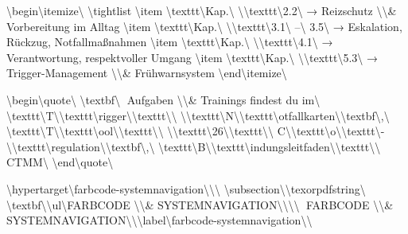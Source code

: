 \textbackslash{}begin\textbackslash{}{itemize\textbackslash{}}
\textbackslash{}tightlist
\textbackslash{}item
  \textbackslash{}texttt\textbackslash{}{Kap.\textbackslash{} \textbackslash{}}\textbackslash{}texttt\textbackslash{}{2.2\textbackslash{}} → Reizschutz \textbackslash{}\textbackslash{}& Vorbereitung im Alltag
\textbackslash{}item
  \textbackslash{}texttt\textbackslash{}{Kap.\textbackslash{} \textbackslash{}}\textbackslash{}texttt\textbackslash{}{3.1\textbackslash{} –\textbackslash{} 3.5\textbackslash{}} → Eskalation, Rückzug, Notfallmaßnahmen
\textbackslash{}item
  \textbackslash{}texttt\textbackslash{}{Kap.\textbackslash{} \textbackslash{}}\textbackslash{}texttt\textbackslash{}{4.1\textbackslash{}} → Verantwortung, respektvoller Umgang
\textbackslash{}item
  \textbackslash{}texttt\textbackslash{}{Kap.\textbackslash{} \textbackslash{}}\textbackslash{}texttt\textbackslash{}{5.3\textbackslash{}} → Trigger-Management \textbackslash{}\textbackslash{}& Frühwarnsystem
\textbackslash{}end\textbackslash{}{itemize\textbackslash{}}

\textbackslash{}begin\textbackslash{}{quote\textbackslash{}}
\textbackslash{}textbf\textbackslash{}{📎 Aufgaben \textbackslash{}\textbackslash{}& Trainings findest du im\textbackslash{}} \textbackslash{}texttt\textbackslash{}{T\textbackslash{}}\textbackslash{}texttt\textbackslash{}{rigger\textbackslash{}}\textbackslash{}texttt\textbackslash{}{\textbackslash{} \textbackslash{}}\textbackslash{}texttt\textbackslash{}{N\textbackslash{}}\textbackslash{}texttt\textbackslash{}{otfallkarten\textbackslash{}}\textbackslash{}textbf\textbackslash{}{,\textbackslash{}} \textbackslash{}texttt\textbackslash{}{T\textbackslash{}}\textbackslash{}texttt\textbackslash{}{ool\textbackslash{}}\textbackslash{}texttt\textbackslash{}{\textbackslash{} \textbackslash{}}\textbackslash{}texttt\textbackslash{}{26\textbackslash{}}\textbackslash{}texttt\textbackslash{}{\textbackslash{} C\textbackslash{}}\textbackslash{}texttt\textbackslash{}{o\textbackslash{}}\textbackslash{}texttt\textbackslash{}{-\textbackslash{}}\textbackslash{}texttt\textbackslash{}{regulation\textbackslash{}}\textbackslash{}textbf\textbackslash{}{,\textbackslash{}} \textbackslash{}texttt\textbackslash{}{B\textbackslash{}}\textbackslash{}texttt\textbackslash{}{indungsleitfaden\textbackslash{}}\textbackslash{}texttt\textbackslash{}{\textbackslash{} CTMM\textbackslash{}}
\textbackslash{}end\textbackslash{}{quote\textbackslash{}}

\textbackslash{}hypertarget\textbackslash{}{farbcode-systemnavigation\textbackslash{}}\textbackslash{}{\textbackslash{}%
\textbackslash{}subsection\textbackslash{}{\textbackslash{}texorpdfstring\textbackslash{}{🎨 \textbackslash{}textbf\textbackslash{}{\textbackslash{}ul\textbackslash{}{FARBCODE \textbackslash{}\textbackslash{}& SYSTEMNAVIGATION\textbackslash{}}\textbackslash{}}\textbackslash{}}\textbackslash{}{🎨 FARBCODE \textbackslash{}\textbackslash{}& SYSTEMNAVIGATION\textbackslash{}}\textbackslash{}}\textbackslash{}label\textbackslash{}{farbcode-systemnavigation\textbackslash{}}\textbackslash{}}

